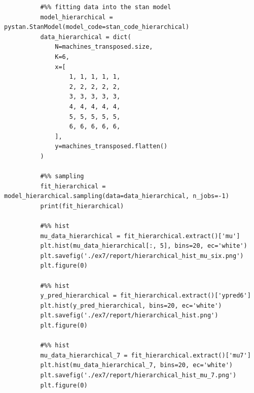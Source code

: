 \documentclass[11pt,a4paper,english]{article}
\begin{document}
\begin{appendices}
\begin{verbatim}
          #%% fitting data into the stan model
          model_hierarchical = pystan.StanModel(model_code=stan_code_hierarchical)
          data_hierarchical = dict(
              N=machines_transposed.size,
              K=6,
              x=[
                  1, 1, 1, 1, 1,
                  2, 2, 2, 2, 2,
                  3, 3, 3, 3, 3,
                  4, 4, 4, 4, 4,
                  5, 5, 5, 5, 5,
                  6, 6, 6, 6, 6,
              ],
              y=machines_transposed.flatten()
          )

          #%% sampling
          fit_hierarchical = model_hierarchical.sampling(data=data_hierarchical, n_jobs=-1)
          print(fit_hierarchical)

          #%% hist
          mu_data_hierarchical = fit_hierarchical.extract()['mu']
          plt.hist(mu_data_hierarchical[:, 5], bins=20, ec='white')
          plt.savefig('./ex7/report/hierarchical_hist_mu_six.png')
          plt.figure(0)

          #%% hist
          y_pred_hierarchical = fit_hierarchical.extract()['ypred6']
          plt.hist(y_pred_hierarchical, bins=20, ec='white')
          plt.savefig('./ex7/report/hierarchical_hist.png')
          plt.figure(0)

          #%% hist
          mu_data_hierarchical_7 = fit_hierarchical.extract()['mu7']
          plt.hist(mu_data_hierarchical_7, bins=20, ec='white')
          plt.savefig('./ex7/report/hierarchical_hist_mu_7.png')
          plt.figure(0)
        \end{verbatim}
      \end{appendices}
  
\end{document}
